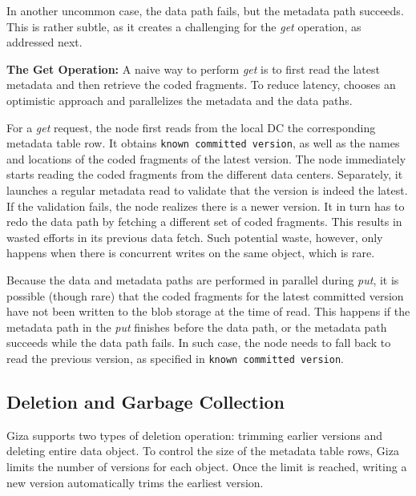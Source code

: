 In another uncommon case, the data path fails, but the metadata path succeeds.
This is rather subtle, as it creates a challenging for the {\em get} operation,
as addressed next.

{\bf The Get Operation:}
A naive way to perform {\em get} is to first read the latest metadata and then retrieve the coded fragments.
To reduce latency, {\name} chooses an optimistic approach and parallelizes the metadata and the data paths.

For a {\em get} request, the {\name} node first reads from the local DC the corresponding metadata table row.
It obtains {\tt known committed version}, as well as the names and locations of the coded fragments of the latest version.
The \name node immediately starts reading the coded fragments from the different data centers.
Separately, it launches a regular metadata read to validate that the version is indeed the latest.
If the validation fails, the \name node realizes there is a newer version.
It in turn has to redo the data path by fetching a different set of coded fragments.
This results in wasted efforts in its previous data fetch.
Such potential waste, however, only happens when there is concurrent writes on the same object,
which is rare.

Because the data and metadata paths are performed in parallel during {\em put},
it is possible (though rare) that the coded fragments for the latest committed version
have not been written to the blob storage at the time of read.
This happens if the metadata path in the {\em put} finishes before the data path,
or the metadata path succeeds while the data path fails.
In such case, the {\name} node needs to fall back to read the previous version,
as specified in {\tt known committed version}.


\subsection{Deletion and Garbage Collection}

Giza supports two types of deletion operation: trimming earlier versions and deleting entire data object.
To control the size of the metadata table rows, Giza limits the number of versions for each object.
Once the limit is reached, writing a new version automatically trims the earliest version.

